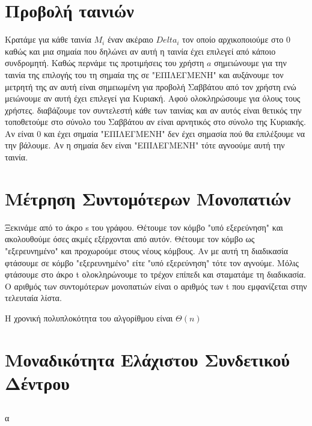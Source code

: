 \documentclass[a4paper,10pt]{article}
\begin{document}
\def\thesubsection {\alph{subsection}}
\renewcommand{\labelenumi}{\roman{enumi})}
\renewcommand{\labelenumii}{(\arabic{enumii})}



\section{Προβολή ταινιών} \setcounter{section}{1}

Κρατάμε για κάθε ταινία $M_i$ έναν ακέραιο $Delta_i$ τον οποίο αρχικοποιούμε
στο 0 καθώς και μια σημαία που δηλώνει αν αυτή η ταινία έχει επιλεγεί από
κάποιο συνδρομητή. Καθώς περνάμε τις προτιμήσεις του χρήστη $a$ σημειώνουμε
για την ταινία της επιλογής του τη σημαία της σε "ΕΠΙΛΕΓΜΕΝΗ" και αυξάνουμε
τον μετρητή της αν αυτή είναι σημειωμένη για προβολή Σαββάτου από τον χρήστη
ενώ μειώνουμε αν αυτή έχει επιλεγεί για Κυριακή. Αφού ολοκληρώσουμε για όλους
τους χρήστες. διαβάζουμε τον συντελεστή κάθε των ταινίας και αν αυτός είναι
θετικός την τοποθετούμε στο σύνολο του Σαββάτου αν είναι αρνητικός στο σύνολο
της Κυριακής. Αν είναι 0 και έχει σημαία "ΕΠΙΛΕΓΜΕΝΗ" δεν έχει σημασία πού θα
επιλέξουμε να την βάλουμε.  Αν η σημαία δεν είναι "ΕΠΙΛΕΓΜΕΝΗ" τότε αγνοούμε
αυτή την ταινία.

\section{Μέτρηση Συντομότερων Μονοπατιών}
Ξεκινάμε από το άκρο s του γράφου. Θέτουμε τον κόμβο "υπό εξερεύνηση" και
ακολουθούμε όσες ακμές εξέρχονται από αυτόν. Θέτουμε τον κόμβο ως
"εξερευνημένο" και προχωρούμε στους νέους κόμβους. Αν με αυτή τη διαδικασία
φτάσουμε σε κόμβο "εξερευνημένο" είτε "υπό εξερεύνηση" τότε τον αγνούμε. Μόλις
φτάσουμε στο άκρο t ολοκληρώνουμε το τρέχον επίπεδι και σταματάμε τη
διαδικασία. Ο αριθμός των συντομότερων μονοπατιών είναι ο αριθμός των t που
εμφανίζεται στην τελευταία λίστα.



Η χρονική πολυπλοκότητα του αλγορίθμου είναι $\Theta(n)$


\section{Μοναδικότητα Ελάχιστου Συνδετικού Δέντρου}
\subsection{}
α
\end{document}
